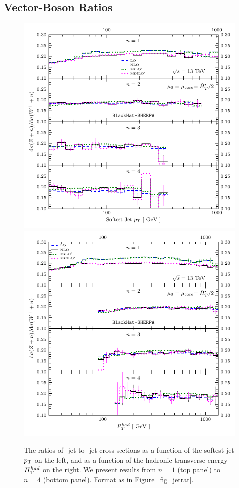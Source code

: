 \subsection{Vector-Boson Ratios}
\label{sec_ratiowmwp}
\begin{figure}[t]

\includegraphics[clip,scale=0.73]{plots/flavorratio_Z_Wp_13TeV_anti-kt-R4-Pt30_jets_jet_1_1_pt__Kn}
\includegraphics[clip,scale=0.73]{plots/flavorratio_Z_Wp_13TeV_anti-kt-R4-Pt30_jets_HT_C}
\caption{The ratios of \Zjn-jet to \Wpjn-jet cross sections as a function of
the softest-jet $p_{\textrm T}$ on the left, and as a function of
the hadronic transverse energy $H_{\textrm T}^{had}$ on the right. We present
results from $n=1$ (top panel) to $n=4$ (bottom panel). Format as in
Figure~\ref{fig_jetrat}.
}
\label{fig_ZWp_rat}
\end{figure}
